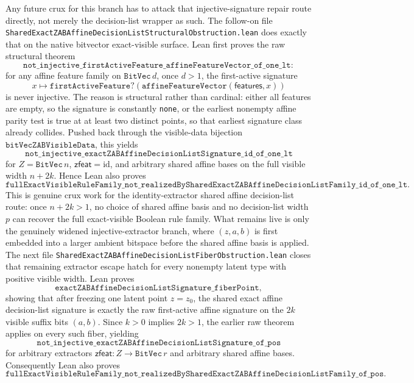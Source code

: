 \documentclass[11pt]{article}
\theoremstyle{remark}
\begin{document}
Any future crux for this branch has to attack that injective-signature repair
route directly, not merely the decision-list wrapper as such.
The follow-on file
\texttt{SharedExactZABAffineDecisionListStructuralObstruction.lean} does
exactly that on the native bitvector exact-visible surface.  Lean first proves
the raw structural theorem
\[
  \texttt{not\_injective\_firstActiveFeature\_affineFeatureVector\_of\_one\_lt}:
\]
for any affine feature family on \(\texttt{BitVec}\, d\), once \(d > 1\), the
first-active signature
\[
  x \mapsto
  \texttt{firstActiveFeature?}(\texttt{affineFeatureVector}(\mathsf{features},x))
\]
is never injective.  The reason is structural rather than cardinal: either all
features are empty, so the signature is constantly \texttt{none}, or the
earliest nonempty affine parity test is true at at least two distinct points,
so that earliest signature class already collides.  Pushed back through the
visible-data bijection \(\texttt{bitVecZABVisibleData}\), this yields
\[
  \texttt{not\_injective\_exactZABAffineDecisionListSignature\_id\_of\_one\_lt}
\]
for \(Z = \texttt{BitVec}\, n\), \(\mathsf{zfeat} = \mathrm{id}\), and
arbitrary shared affine bases on the full visible width \(n + 2k\).  Hence Lean
also proves
\[
  \texttt{fullExactVisibleRuleFamily\_not\_realizedBySharedExactZABAffineDecisionListFamily\_id\_of\_one\_lt}.
\]
This is genuine crux work for the identity-extractor shared affine
decision-list route: once \(n + 2k > 1\), no choice of shared affine basis and
no decision-list width \(p\) can recover the full exact-visible Boolean rule
family.  What remains live is only the genuinely widened injective-extractor
branch, where \((z,a,b)\) is first embedded into a larger ambient bitspace
before the shared affine basis is applied.
The next file
\texttt{SharedExactZABAffineDecisionListFiberObstruction.lean} closes that
remaining extractor escape hatch for every nonempty latent type with positive
visible width.  Lean proves
\[
  \texttt{exactZABAffineDecisionListSignature\_fiberPoint},
\]
showing that after freezing one latent point \(z=z_0\), the shared exact affine
decision-list signature is exactly the raw first-active affine signature on the
\(2k\) visible suffix bits \((a,b)\).  Since \(k>0\) implies \(2k>1\), the
earlier raw theorem applies on every such fiber, yielding
\[
  \texttt{not\_injective\_exactZABAffineDecisionListSignature\_of\_pos}
\]
for arbitrary extractors \(\mathsf{zfeat} : Z \to \texttt{BitVec}\, r\) and
arbitrary shared affine bases.  Consequently Lean also proves
\[
  \texttt{fullExactVisibleRuleFamily\_not\_realizedBySharedExactZABAffineDecisionListFamily\_of\_pos}.
\]
\end{document}
